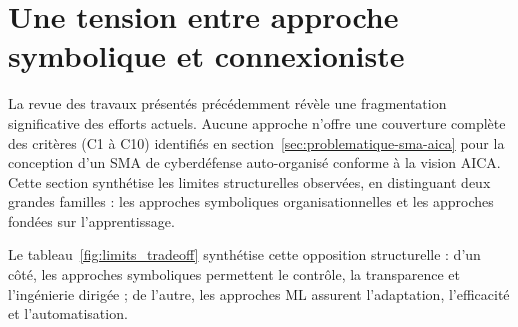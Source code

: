 \documentclass[ twoside,openright,titlepage,numbers=noenddot,headinclude,%
                footinclude=true,cleardoublepage=empty,abstractoff, %
                BCOR=5mm,paper=a4,fontsize=11pt,%
                french,american,%
                ]{scrreprt}
\begin{document}
\section{Une tension entre approche symbolique et connexioniste}\label{sec:limits-existing}

La revue des travaux présentés précédemment révèle une fragmentation significative des efforts actuels. Aucune approche n'offre une couverture complète des critères (C1 à C10) identifiés en section~\ref{sec:problematique-sma-aica} pour la conception d'un SMA de cyberdéfense auto-organisé conforme à la vision AICA. Cette section synthétise les limites structurelles observées, en distinguant deux grandes familles : les approches symboliques organisationnelles et les approches fondées sur l'apprentissage.


Le tableau~\ref{fig:limits_tradeoff} synthétise cette opposition structurelle : d'un côté, les approches symboliques permettent le contrôle, la transparence et l'ingénierie dirigée ; de l'autre, les approches ML assurent l'adaptation, l'efficacité et l'automatisation.
\end{document}

